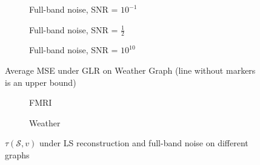 \documentclass[11pt,onecolumn,journal]{IEEEtran}
\theoremstyle{definition}
\newcommand{\set}[1]{\mathcal{#1}}
\begin{document}
\begin{figure}[h!]%
    \centering
    \begin{subfigure}{0.3\columnwidth}
    \caption{Full-band noise, SNR = $10^{-1}$}
    \label{r1GLR_MSE_subfiga}
    \end{subfigure}\hfill
    \begin{subfigure}{0.3\columnwidth}
    \caption{Full-band noise, SNR = $\frac{1}{2}$}%
    \label{r1GLR_MSE_subfigb}%
    \end{subfigure}\hfill%
    \begin{subfigure}{0.3\columnwidth}
    \caption{Full-band noise, SNR = $10^{10}$}%
    \label{r1GLR_MSE_subfigc}%
    \end{subfigure}%
    
    \caption{Average MSE under GLR on Weather Graph (line without markers is an upper bound)}
\label{r1GLR_weather_MSE_fig}
\end{figure}

\begin{figure}[h!]%
    \centering
    \begin{subfigure}{0.4\columnwidth}
    \caption{FMRI}
    \label{r1tau_FMRI_LS}
    \end{subfigure}\hfill
    \begin{subfigure}{0.4\columnwidth}
    \caption{Weather}
    \label{r1GLR_MSE_subfigb}%
    \end{subfigure}
    
    \caption{$\tau(\set{S},v)$ under LS reconstruction and full-band noise on different graphs }
\label{r1fig:LS_tau_real}
\end{figure}
\end{document}
